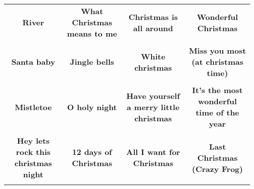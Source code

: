 \documentclass[12pt]{article} \usepackage{eso-pic, graphicx}
\newcommand{\background}[1]{%
\AddToShipoutPictureBG*{\texttt{[image: \#1]}}
}
\begin{document}
\tabcolsep=30.2pt \renewcommand{\arraystretch}{4.5}   \vspace*{4.3cm} \begin{center}  \begin{tabular}{c c c c}
\parbox{3cm}{\centering \textbf{River}}& 
\parbox{3cm}{\centering \textbf{What Christmas means to me}}& 
\parbox{3cm}{\centering \textbf{Christmas is all around}}& 
\parbox{3cm}{\centering \textbf{Wonderful Christmas}}\\ \\ 
\parbox{3cm}{\centering \textbf{Santa baby}}& 
\parbox{3cm}{\centering \textbf{Jingle bells}}& 
\parbox{3cm}{\centering \textbf{White christmas}}& 
\parbox{3cm}{\centering \textbf{Miss you most (at christmas time)}}\\ \\ 
\parbox{3cm}{\centering \textbf{Mistletoe}}& 
\parbox{3cm}{\centering \textbf{O holy night}}& 
\parbox{3cm}{\centering \textbf{Have yourself a merry little christmas}}& 
\parbox{3cm}{\centering \textbf{It’s the most wonderful time of the year}}\\ \\ 
\parbox{3cm}{\centering \textbf{Hey lets rock this christmas night}}& 
\parbox{3cm}{\centering \textbf{12 days of Christmas}}& 
\parbox{3cm}{\centering \textbf{All I want for Christmas}}& 
\parbox{3cm}{\centering \textbf{Last Christmas (Crazy Frog)}}\\ \\ 
\end{tabular} \background{discobingo.pdf} \end{center} 
\end{document}

